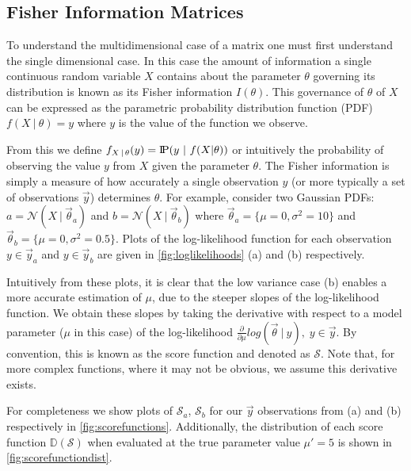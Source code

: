 \subsection{Fisher Information Matrices}
\label{ssec:Bfisherinformation}

To understand the multidimensional case of a matrix one must first understand the single dimensional case. In this case the amount of information a single continuous random variable $X$ contains about the parameter $\theta$ governing its distribution is known as its Fisher information $I(\theta)$. This governance of $\theta$ of $X$ can be expressed as the parametric probability distribution function (PDF) $f(X\ |\ \theta) = y$ where $y$ is the value of the function we observe.\par
From this we define $f_{X\,|\,\theta}(y) = \text{I\kern-0.15em P}(y\ |\ f(X|\theta))$ or intuitively the probability of observing the value $y$ from $X$ given the parameter $\theta$. The Fisher information is simply a measure of how accurately a single observation $y$ (or more typically a set of observations $\vec{y}$) determines $\theta$. For example, consider two Gaussian PDFs: $a = \mathcal{N}(X\ |\ \vec{\theta}_a)$ and $b = \mathcal{N}(X\ |\ \vec{\theta}_b)$ where $\vec{\theta}_a = \{\mu=0, \sigma^2=10\}$ and $\vec{\theta}_b = \{\mu=0,\sigma^2=0.5\}$. Plots of the log-likelihood function for each observation $y\in\vec{y}_a$ and $y\in\vec{y}_b$ are given in \cref{fig:loglikelihoods} (a) and (b) respectively.\par
Intuitively from these plots, it is clear that the low variance case (b) enables a more accurate estimation of $\mu$, due to the steeper slopes of the log-likelihood function. We obtain these slopes by taking the derivative with respect to a model parameter ($\mu$ in this case) of the log-likelihood $\frac{\partial}{\partial\mu} log(\vec{\theta}\ |\ y),\;y\in\vec{y}$. By convention, this is known as the score function and denoted as $\mathcal{S}$. Note that, for more complex functions, where it may not be obvious, we assume this derivative exists.\par
For completeness we show plots of $\mathcal{S}_a$, $\mathcal{S}_b$ for our $\vec{y}$ observations from (a) and (b) respectively in \cref{fig:scorefunctions}. Additionally, the distribution of each score function $\mathbb{D}(\mathcal{S})$ when evaluated at the true parameter value $\mu' = 5$ is shown in \cref{fig:scorefunctiondist}.\par
